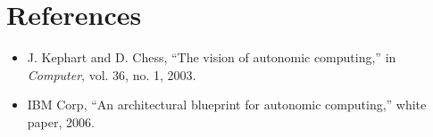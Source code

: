 \documentclass[conference]{IEEEtran}
\begin{document}
\section*{References}
\begin{itemize}
    \item [1] J. Kephart and D. Chess, ``The vision of autonomic computing,'' in \textit{Computer}, vol. 36, no. 1, 2003.
    \item [2] IBM Corp, ``An architectural blueprint for autonomic computing,'' white paper, 2006.
\end{itemize}
\end{document}
